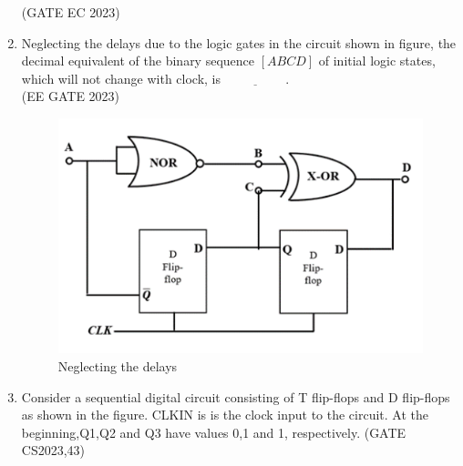 \begin{enumerate}
\begin{figure}[H]
\end{figure}
\hfill(GATE EC 2023)

\item Neglecting the delays due to the logic gates in the circuit shown in figure, the 
decimal equivalent of the binary sequence $[ABCD]$ of initial logic states, which will not change with clock, is $\underline{\hspace{2cm}}$.\\

\hfill{(EE GATE 2023)}\\

\begin{figure}[H]
 \centering
\includegraphics[width=\columnwidth]{ide/7474/figs/Gate_question.png}
\caption{Neglecting the delays}
\label{fig:Gate_question.png}
\end{figure}

\item 
Consider a sequential digital circuit consisting of T flip-flops and D flip-flops as shown in the figure. CLKIN is is the clock input to the circuit. At the beginning,Q1,Q2 and Q3 have values 0,1 and 1, respectively.
\hfill(GATE CS2023,43)


\end{enumerate}
